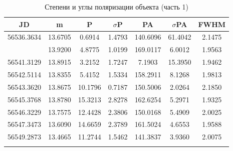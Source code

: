 \begin{table}[h]
  \centering
  \caption{Степени и углы поляризации объекта (часть 1)}
  \begin{tabular}{ccccccc}
    \toprule
    JD &
    m &
    P &
    $\sigma$P &
    PA &
    $\sigma$PA &
    FWHM \\
    \midrule
    56536.3634 & 13.6705 & 0.6914 & 1.4793 & 140.6096 & 61.4042 & 2.1475 \\
    \arrayrulecolor{black!40}
    \midrule
    56540.4348 & 13.9200 & 4.8775 & 1.0199 & 169.0117 & 6.0012 & 1.9563 \\
    \midrule
    56541.3129 & 13.8915 & 3.2152 & 1.7247 & 7.1903 & 15.3950 & 1.9462 \\
    \midrule
    56542.5114 & 13.8355 & 5.4152 & 1.5334 & 158.2911 & 8.1268 & 1.9813 \\
    \midrule
    56543.3620 & 13.8675 & 10.1796 & 0.7187 & 150.5006 & 2.0264 & 2.1850 \\
    \midrule
    56545.3768 & 13.8780 & 15.3213 & 2.8278 & 162.6254 & 5.2971 & 1.9325 \\
    \midrule
    56546.3229 & 13.7575 & 12.4428 & 2.3806 & 150.0168 & 5.4909 & 2.0025 \\
    \midrule
    56547.3473 & 13.6090 & 14.6659 & 2.3789 & 161.5024 & 4.6553 & 1.9588 \\
    \midrule
    56549.2873 & 13.4665 & 11.2744 & 1.5462 & 141.3837 & 3.9360 & 2.0075 \\
    \arrayrulecolor{black}
    \bottomrule
  \end{tabular}
\end{table}

\newpage

